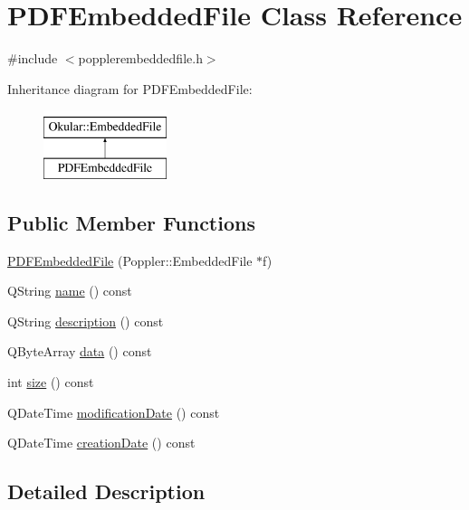 \hypertarget{classPDFEmbeddedFile}{\section{P\+D\+F\+Embedded\+File Class Reference}
\label{classPDFEmbeddedFile}
}


{\ttfamily \#include $<$popplerembeddedfile.\+h$>$}

Inheritance diagram for P\+D\+F\+Embedded\+File\+:\begin{figure}[H]
\begin{center}
\leavevmode
\includegraphics[height=2.000000cm]{classPDFEmbeddedFile}
\end{center}
\end{figure}
\subsection*{Public Member Functions}
\begin{DoxyCompactItemize}
\item 
\hyperlink{classPDFEmbeddedFile_a64910dc3d3bd5c512cf2f84c83a75e8a}{P\+D\+F\+Embedded\+File} (Poppler\+::\+Embedded\+File $\ast$f)
\item 
Q\+String \hyperlink{classPDFEmbeddedFile_a86ea1dc63155d399a7dd4a07cbd49c95}{name} () const 
\item 
Q\+String \hyperlink{classPDFEmbeddedFile_a4d4d9945b51d163a7858490b8d16067f}{description} () const 
\item 
Q\+Byte\+Array \hyperlink{classPDFEmbeddedFile_adb521f86e0ddbce9c0979c4e8e047528}{data} () const 
\item 
int \hyperlink{classPDFEmbeddedFile_a6dff6219ab04d7e97e5d13f0358e38f0}{size} () const 
\item 
Q\+Date\+Time \hyperlink{classPDFEmbeddedFile_a4796deeca1eae449fe083b71552b90ca}{modification\+Date} () const 
\item 
Q\+Date\+Time \hyperlink{classPDFEmbeddedFile_aa067bc65a91763d7db18306f04a54733}{creation\+Date} () const 
\end{DoxyCompactItemize}


\subsection{Detailed Description}


